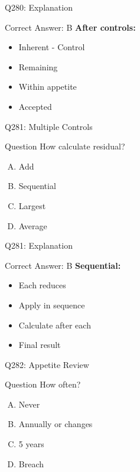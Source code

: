 \documentclass{beamer}
\begin{document}
	\begin{frame}{Q280: Explanation}
		\begin{block}{Correct Answer: B}
			\textbf{After controls:}
			\begin{itemize}
				\item Inherent - Control
				\item Remaining
				\item Within appetite
				\item Accepted
			\end{itemize}
		\end{block}
	\end{frame}
	
	\begin{frame}{Q281: Multiple Controls}
		\begin{block}{Question}
			How calculate residual?
		\end{block}
		\begin{enumerate}[(A)]
			\item Add
			\item Sequential
			\item Largest
			\item Average
		\end{enumerate}
	\end{frame}
	
	\begin{frame}{Q281: Explanation}
		\begin{block}{Correct Answer: B}
			\textbf{Sequential:}
			\begin{itemize}
				\item Each reduces
				\item Apply in sequence
				\item Calculate after each
				\item Final result
			\end{itemize}
		\end{block}
	\end{frame}
	
	\begin{frame}{Q282: Appetite Review}
		\begin{block}{Question}
			How often?
		\end{block}
		\begin{enumerate}[(A)]
			\item Never
			\item Annually or changes
			\item 5 years
			\item Breach
		\end{enumerate}
	\end{frame}
	
\end{document}

